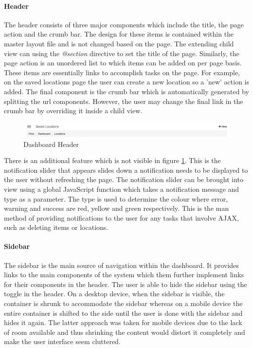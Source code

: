 \paragraph{Header}
The header consists of three major components which include the title, the page action and the crumb bar. The design for these items is contained within the master layout file and is not changed based on the page. The extending child view can using the \emph{@section} directive to set the title of the page. Similarly, the page action is an unordered list to which items can be added on per page basis. These items are essentially links to accomplish tasks on the page. For example, on the saved locations page the user can create a new location so a 'new' action is added. The final component is the crumb bar which is automatically generated by splitting the url components. However, the user may change the final link in the crumb bar by overriding it inside a child view.

\begin{figure}[H]
	\centering
	\includegraphics[width=1.0\textwidth]{images/Frisk/Dashboard_Header}
	\caption{Dashboard Header} \label{fig:Dashboard_Header}
\end{figure}

There is an additional feature which is not visible in figure \ref{fig:Dashboard_Header}. This is the notification slider that appears slides down a notification needs to be displayed to the user without refreshing the page. The notification slider can be brought into view using a global JavaScript function which takes a notification message and type as a parameter. The type is used to determine the colour where error, warning and success are red, yellow and green respectively. This is the man method of providing notifications to the user for any tasks that involve AJAX, such as deleting items or locations.

\paragraph{Sidebar}

The sidebar is the main source of navigation within the dashboard. It provides links to the main components of the system which them further implement links for their components in the header. The user is able to hide the sidebar using the toggle in the header. On a desktop device, when the sidebar is visible, the container is shrunk to accommodate the sidebar whereas on a mobile device the entire container is shifted to the side until the user is done with the sidebar and hides it again. The latter approach was taken for mobile devices due to the lack of room available and thus shrinking the content would distort it completely and make the user interface seem cluttered.

